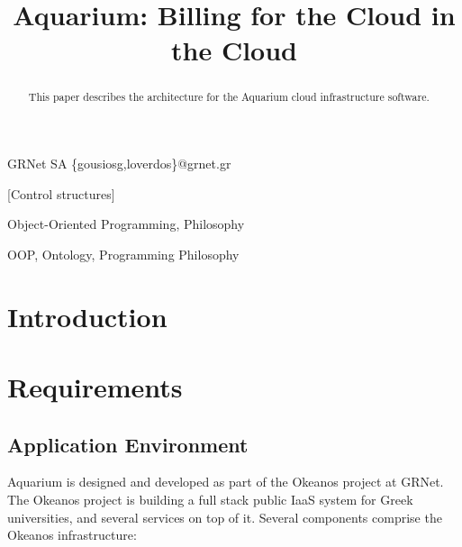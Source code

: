 \documentclass[preprint,10pt]{sigplanconf}
\begin{document}




\title{Aquarium: Billing for the Cloud in the Cloud}

{GRNet SA}
{\{gousiosg,loverdos\}@grnet.gr}

\maketitle
\begin{abstract}
    This paper describes the architecture for the Aquarium cloud infrastructure
    software.
\end{abstract}

[Control structures]

\terms
    Object-Oriented Programming, Philosophy

\keywords
    OOP, Ontology, Programming Philosophy

\section{Introduction}
\section{Requirements}


\subsection{Application Environment}
Aquarium is designed and developed as part of the Okeanos project at GRNet. The
Okeanos project is building a full stack public IaaS system for Greek
universities, and several services on top of it. Several components comprise
the Okeanos infrastructure:
\end{document}
